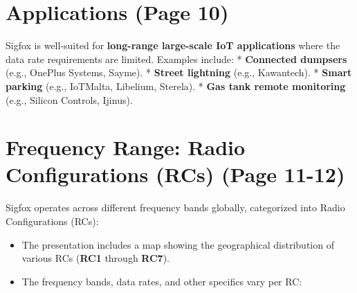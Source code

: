 \documentclass[a4paper, 12pt]{book} %
\begin{document}
\section{Applications (Page 10)}\label{applications-page-10}

Sigfox is well-suited for \textbf{long-range large-scale IoT
applications} where the data rate requirements are limited. Examples
include: * \textbf{Connected dumpsers} (e.g., OnePlus Systems, Sayme). *
\textbf{Street lightning} (e.g., Kawantech). * \textbf{Smart parking}
(e.g., IoTMalta, Libelium, Sterela). * \textbf{Gas tank remote
monitoring} (e.g., Silicon Controls, Ijinus).

\section{Frequency Range: Radio Configurations (RCs) (Page
11-12)}\label{frequency-range-radio-configurations-rcs-page-11-12}

Sigfox operates across different frequency bands globally, categorized
into Radio Configurations (RCs):

\begin{itemize}
\tightlist
\item
  The presentation includes a map showing the geographical distribution
  of various RCs (\textbf{RC1} through \textbf{RC7}).
\item
  The frequency bands, data rates, and other specifics vary per RC:
\end{itemize}
\end{document}
